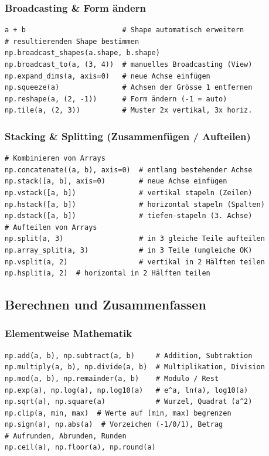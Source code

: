 \subsubsection{Broadcasting \& Form ändern}\label{sec:07-broadcasting-und-shapes}
\begin{codebox}
\begin{lstlisting}[style=CodeExpert]
a + b                       # Shape automatisch erweitern
# resultierenden Shape bestimmen
np.broadcast_shapes(a.shape, b.shape)
np.broadcast_to(a, (3, 4))  # manuelles Broadcasting (View)
np.expand_dims(a, axis=0)   # neue Achse einfügen
np.squeeze(a)               # Achsen der Grösse 1 entfernen
np.reshape(a, (2, -1))      # Form ändern (-1 = auto)
np.tile(a, (2, 3))          # Muster 2x vertikal, 3x horiz.
\end{lstlisting}
\end{codebox}


\subsubsection{Stacking \& Splitting (Zusammenfügen / Aufteilen)}\label{sec:07-stacking-und-splitting}
\begin{codebox}
\begin{lstlisting}[style=CodeExpert]
# Kombinieren von Arrays
np.concatenate((a, b), axis=0)  # entlang bestehender Achse
np.stack([a, b], axis=0)        # neue Achse einfügen
np.vstack([a, b])               # vertikal stapeln (Zeilen)
np.hstack([a, b])               # horizontal stapeln (Spalten)
np.dstack([a, b])               # tiefen-stapeln (3. Achse)
# Aufteilen von Arrays
np.split(a, 3)                  # in 3 gleiche Teile aufteilen
np.array_split(a, 3)            # in 3 Teile (ungleiche OK)
np.vsplit(a, 2)                 # vertikal in 2 Hälften teilen
np.hsplit(a, 2)  # horizontal in 2 Hälften teilen
\end{lstlisting}
\end{codebox}


\subsection{Berechnen und Zusammenfassen}\label{sec:07-berechnen-und-zusammenfassen}
\subsubsection{Elementweise Mathematik}\label{sec:07-mathematik}
\begin{codebox}
\begin{lstlisting}[style=CodeExpert]
np.add(a, b), np.subtract(a, b)     # Addition, Subtraktion
np.multiply(a, b), np.divide(a, b)  # Multiplikation, Division
np.mod(a, b), np.remainder(a, b)    # Modulo / Rest
np.exp(a), np.log(a), np.log10(a)   # e^a, ln(a), log10(a)
np.sqrt(a), np.square(a)            # Wurzel, Quadrat (a^2)
np.clip(a, min, max)  # Werte auf [min, max] begrenzen
np.sign(a), np.abs(a)  # Vorzeichen (-1/0/1), Betrag
# Aufrunden, Abrunden, Runden
np.ceil(a), np.floor(a), np.round(a)
\end{lstlisting}
\end{codebox}


